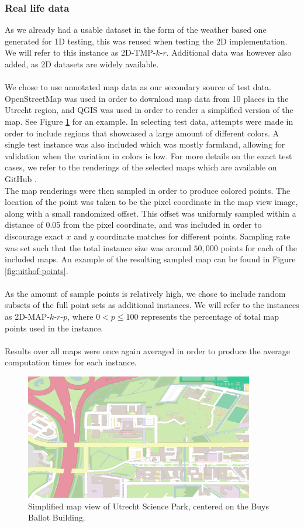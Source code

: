 \documentclass{article}
\begin{document}
\subsubsection*{Real life data}
As we already had a usable dataset in the form of the weather based one generated for 1D testing, this was reused when testing the 2D implementation. We will refer to this instance as 2D-TMP-$k$-$r$. Additional data was however also added, as 2D datasets are widely available. \\\\
We chose to use annotated map data as our secondary source of test data. OpenStreetMap \cite{OpenStreetMap} was used in order to download map data from 10 places in the Utrecht region, and QGIS \cite{QGIS_software} was used in order to render a simplified version of the map. See Figure \ref{fig:uithof} for an example. In selecting test data, attempts were made in order to include regions that showcased a large amount of different colors. A single test instance was also included which was mostly farmland, allowing for validation when the variation in colors is low. For more details on the exact test cases, we refer to the renderings of the selected maps which are available on GitHub \cite{vanderPlasImplementation}. \\
The map renderings were then sampled in order to produce colored points. The location of the point was taken to be the pixel coordinate in the map view image, along with a small randomized offset. This offset was uniformly sampled within a distance of 0.05 from the pixel coordinate, and was included in order to discourage exact $x$ and $y$ coordinate matches for different points. Sampling rate was set such that the total instance size was around $50,000$ points for each of the included maps. An example of the resulting sampled map can be found in Figure \ref{fig:uithof-points}. \\\\
As the amount of sample points is relatively high, we chose to include random subsets of the full point sets as additional instances. We will refer to the instances as 2D-MAP-$k$-$r$-$p$, where $0 < p \leq 100$ represents the percentage of total map points used in the instance. \\\\
Results over all maps were once again averaged in order to produce the average computation times for each instance.

\begin{figure}
    \centering
    \includegraphics[width=10cm]{figs/usp.png}
    \caption{Simplified map view of Utrecht Science Park, centered on the Buys Ballot Building.}
    \label{fig:uithof}
\end{figure}
\end{document}
